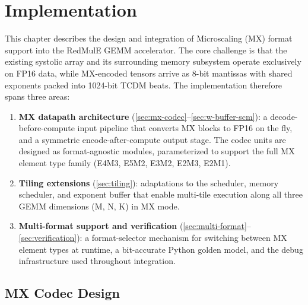 \chapter{Implementation}
\label{ch:implementation}

This chapter describes the design and integration of Microscaling (MX) format
support into the RedMulE GEMM accelerator. The core challenge is that the
existing systolic array and its surrounding memory subsystem operate exclusively
on FP16 data, while MX-encoded tensors arrive as 8-bit mantissas with shared
exponents packed into 1024-bit TCDM beats. The implementation therefore spans
three areas:

\begin{enumerate}
    \item \textbf{MX datapath architecture}
          (\autoref{sec:mx-codec}--\autoref{sec:w-buffer-scm}): a
          decode-before-compute input pipeline that converts MX blocks to FP16 on
          the fly, and a symmetric encode-after-compute output stage. The codec
          units are designed as format-agnostic modules, parameterized to support
          the full MX element type family (E4M3, E5M2, E3M2, E2M3, E2M1).
    \item \textbf{Tiling extensions}
          (\autoref{sec:tiling}): adaptations to the
          scheduler, memory scheduler, and exponent buffer that enable
          multi-tile execution along all three GEMM dimensions (M, N, K) in MX
          mode.
    \item \textbf{Multi-format support and verification}
          (\autoref{sec:multi-format}--\autoref{sec:verification}): a
          format-selector mechanism for switching between MX element types at
          runtime, a bit-accurate Python golden model, and the debug
          infrastructure used throughout integration.
\end{enumerate}



\section{MX Codec Design}
\label{sec:mx-codec}

